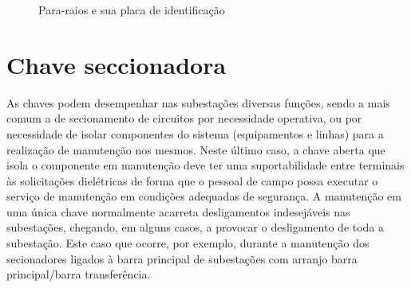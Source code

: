 \documentclass[a5paper,english,spanish,brazil]{ufsc-thesis}
\begin{document}
\begin{figure}[htb]
  \caption{Para-raios e sua placa de identificação}
  \centering
\end{figure}

\section{Chave seccionadora}
As chaves podem desempenhar nas subestações diversas funções, sendo a mais comum a de secionamento de circuitos por necessidade operativa, ou por necessidade de isolar componentes do sistema (equipamentos e linhas) para a realização de manutenção nos mesmos. Neste último caso, a chave aberta que isola o componente em manutenção deve ter uma suportabilidade entre terminais às solicitações dielétricas de forma que o pessoal de campo possa executar o serviço de manutenção em condições adequadas de segurança. A manutenção em uma única chave normalmente acarreta desligamentos indesejáveis nas subestações, chegando, em alguns casos, a provocar o desligamento de toda a subestação. Este caso que ocorre, por exemplo, durante a manutenção dos secionadores ligados à barra principal de subestações com arranjo barra principal/barra transferência.
\end{document}
